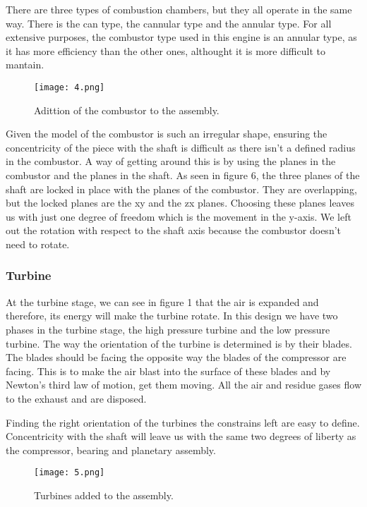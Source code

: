 \documentclass[12pt, letterpaper]{article}
\begin{document}
There are three types of combustion chambers, but they all operate in the same way. There is the can type, the cannular type and the annular type. For all extensive purposes, the combustor type used in this engine is an annular type, as it has more efficiency than the other ones, althought it is more difficult to mantain.

\begin{figure}[H]
	\centering
	\texttt{[image: 4.png]}
	\caption{Adittion of the combustor to the assembly.}
\end{figure}

Given the model of the combustor is such an irregular shape, ensuring the concentricity of the piece with the shaft is difficult as there isn't a defined radius in the combustor. A way of getting around this is by using the planes in the combustor and the planes in the shaft. As seen in figure 6, the three planes of the shaft are locked in place with the planes of the combustor. They are overlapping, but the locked planes are the xy and the zx planes. Choosing these planes leaves us with just one degree of freedom which is the movement in the y-axis. We left out the rotation with respect to the shaft axis because the combustor doesn't need to rotate.
\subsubsection*{Turbine}

At the turbine stage, we can see in figure 1 that the air is expanded and therefore, its energy will make the turbine rotate. In this design we have two phases in the turbine stage, the high pressure turbine and the low pressure turbine. The way the orientation of the turbine is determined is by their blades. The blades should be facing the opposite way the blades of the compressor are facing. This is to make the air blast into the surface of these blades and by Newton's third law of motion, get them moving. All the air and residue gases flow to the exhaust and are disposed.

Finding the right orientation of the turbines the constrains left are easy to define. Concentricity with the shaft will leave us with the same two degrees of liberty as the compressor, bearing and planetary assembly.

\begin{figure}[H]
	\centering
	\texttt{[image: 5.png]}
	\caption{Turbines added to the assembly.}
\end{figure}
\end{document}
